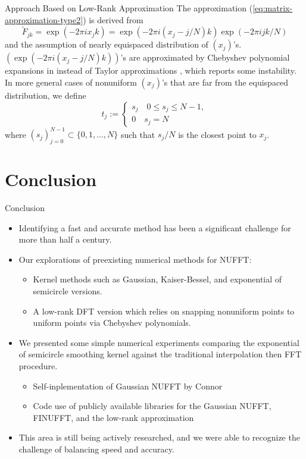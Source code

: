 \documentclass{beamer}
\begin{document}
\begin{frame}{Approach Based on Low-Rank Approximation}
  The approximation (\ref{eq:matrix-approximation-type2}) is derived from 
  \begin{equation}
      \tilde{F}_{jk} = \exp(-2\pi i x_j k)
    = \exp(-2\pi i (x_j - j/N)k)\exp(-2\pi i jk/N)
  \end{equation}
  and the assumption of nearly equispaced distribution of $(x_j)$'s.
  $(\exp(-2\pi i (x_j - j/N)k))$'s are approximated by Chebyshev polynomial expansions 
  in \cite{SISC-2018-Townsend} instead of Taylor approximations \cite{SISC-1996-Anderson}, 
  which reports some instability.
  In more general cases of nonuniform $(x_j)$'s that are far from the equispaced distribution,
  we define 
  \begin{equation}
    t_{j} :=
    \begin{cases}
      s_{j} \quad 0 \le s_{j} \le N-1, \\
      0     \quad s_{j} = N
    \end{cases}
  \end{equation}
  where $(s_{j})_{j=0}^{N-1} \subset \{0, 1, \dots, N\}$ such that
  $s_{j}/N$ is the closest point to $x_{j}$.
\end{frame}

\section{Conclusion}

\begin{frame}{Conclusion}
  \begin{itemize}
    \item Identifying a fast and accurate method has been a significant challenge for more than half a century.
    \item Our explorations of preexisting numerical methods for NUFFT:
    \begin{itemize}
      \item Kernel methods such as Gaussian, Kaiser-Bessel, and exponential of semicircle versions. 
      \item A low-rank DFT version which relies on snapping nonuniform points to uniform points via Chebyshev polynomials.
    \end{itemize}
    \item We presented some simple numerical experiments comparing the exponential of semicircle smoothing kernel against the traditional interpolation then FFT procedure.
    \begin{itemize}
      \item Self-inplementation of Gaussian NUFFT by Connor
      \item Code use of publicly available libraries for the Gaussian NUFFT, FINUFFT, and the low-rank approximation 
    \end{itemize}
    \item This area is still being actively researched, and we were able to recognize the challenge of balancing speed and accuracy.
  \end{itemize}
\end{frame}
\end{document}

